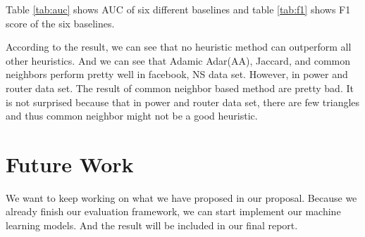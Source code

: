 \documentclass[12pt]{article}
\begin{document}
Table \ref{tab:auc} shows AUC of six different baselines and table \ref{tab:f1} shows F1 score of the six baselines. 

According to the result, we can see that no heuristic method can outperform all other heuristics.  And we can see that Adamic Adar(AA), Jaccard, and common neighbors perform pretty well in facebook, NS data set. However, in power and router data set. The result of common neighbor based method are pretty bad. It is not surprised because that in power and router data set, there are few triangles and thus common neighbor might not be a good heuristic. 

\section{Future Work}
We want to keep working on what we have proposed in our proposal. Because we already finish our evaluation framework, we can start implement our machine learning models. And the result will be included in our final report. 





\end{document}
